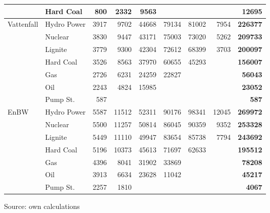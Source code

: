 \begin{table}[htb]
\begin{tabular}{llrrrrrrr}
           &  Hard Coal &        800 &       2332 &       9563 &            &            &            & {\bf 12695} \\
\hline
Vattenfall & Hydro Power &       3917 &       9702 &      44668 &      79134 &      81002 &       7954 & {\bf 226377} \\

           &    Nuclear &       3830 &       9447 &      43171 &      75003 &      73020 &       5262 & {\bf 209733} \\

           &    Lignite &       3779 &       9300 &      42304 &      72612 &      68399 &       3703 & {\bf 200097} \\

           &  Hard Coal &       3526 &       8563 &      37970 &      60655 &      45293 &            & {\bf 156007} \\

           &        Gas &       2726 &       6231 &      24259 &      22827 &            &            & {\bf 56043} \\

           &        Oil &       2243 &       4824 &      15985 &            &            &            & {\bf 23052} \\

           &   Pump St. &        587 &            &            &            &            &            &  {\bf 587} \\
\hline
      EnBW & Hydro Power &       5587 &      11512 &      52311 &      90176 &      98341 &      12045 & {\bf 269972} \\

           &    Nuclear &       5500 &      11257 &      50814 &      86045 &      90359 &       9352 & {\bf 253328} \\

           &    Lignite &       5449 &      11110 &      49947 &      83654 &      85738 &       7794 & {\bf 243692} \\

           &  Hard Coal &       5196 &      10373 &      45613 &      71697 &      62633 &            & {\bf 195512} \\

           &        Gas &       4396 &       8041 &      31902 &      33869 &            &            & {\bf 78208} \\

           &        Oil &       3913 &       6634 &      23628 &      11042 &            &            & {\bf 45217} \\

           &   Pump St. &       2257 &       1810 &            &            &            &            & {\bf 4067} \\
\hline
\hline
\end{tabular}  
\label{tab:statlambda}
\begin{center}
Source: own calculations
\end{center}
\end{table}